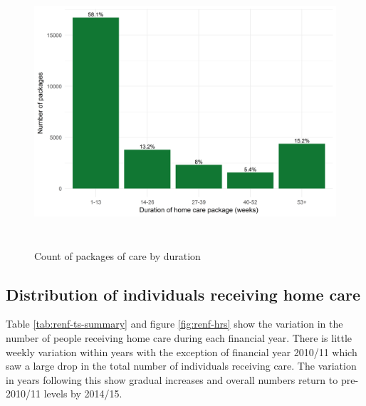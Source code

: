 \documentclass[]{article}
\begin{document}
\begin{figure}[]
  \centering
    \includegraphics[height = 10cm]{figures/chapter-renf/05-duration-plot.png}
    \caption{Count of packages of care by duration}
    \label{fig:ren-duration}
\end{figure}

\FloatBarrier

\subsection{Distribution of individuals receiving home care}\label{renf-results-ts}

Table \ref{tab:renf-ts-summary} and figure \ref{fig:renf-hrs} show the
variation in the number of people receiving home care during each
financial year. There is little weekly variation within years with the
exception of financial year 2010/11 which saw a large drop in the total
number of individuals receiving care. The variation in years following
this show gradual increases and overall numbers return to pre-2010/11
levels by 2014/15.
\end{document}
